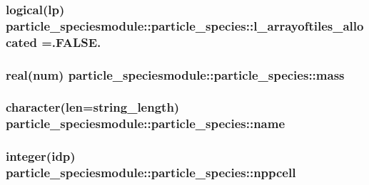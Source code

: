 \subsubsection[{\texorpdfstring{l\+\_\+arrayoftiles\+\_\+allocated}{l_arrayoftiles_allocated}}]{\setlength{\rightskip}{0pt plus 5cm}logical(lp) particle\+\_\+speciesmodule\+::particle\+\_\+species\+::l\+\_\+arrayoftiles\+\_\+allocated =.F\+A\+L\+S\+E.}\hypertarget{structparticle__speciesmodule_1_1particle__species_a7925d60d14a0ec4da1bb9fffb5e5f2ef}{}\label{structparticle__speciesmodule_1_1particle__species_a7925d60d14a0ec4da1bb9fffb5e5f2ef}
\subsubsection[{\texorpdfstring{mass}{mass}}]{\setlength{\rightskip}{0pt plus 5cm}real(num) particle\+\_\+speciesmodule\+::particle\+\_\+species\+::mass}\hypertarget{structparticle__speciesmodule_1_1particle__species_a06cae9ba8f87d3cfcfd1df4b7b2a31d6}{}\label{structparticle__speciesmodule_1_1particle__species_a06cae9ba8f87d3cfcfd1df4b7b2a31d6}
\subsubsection[{\texorpdfstring{name}{name}}]{\setlength{\rightskip}{0pt plus 5cm}character(len=string\+\_\+length) particle\+\_\+speciesmodule\+::particle\+\_\+species\+::name}\hypertarget{structparticle__speciesmodule_1_1particle__species_aa1e042e7e07eb5fbf85a87e3fde7e325}{}\label{structparticle__speciesmodule_1_1particle__species_aa1e042e7e07eb5fbf85a87e3fde7e325}
\subsubsection[{\texorpdfstring{nppcell}{nppcell}}]{\setlength{\rightskip}{0pt plus 5cm}integer(idp) particle\+\_\+speciesmodule\+::particle\+\_\+species\+::nppcell}\hypertarget{structparticle__speciesmodule_1_1particle__species_a85d9fbe02cbe094dd5d45b29e5a5cb52}{}\label{structparticle__speciesmodule_1_1particle__species_a85d9fbe02cbe094dd5d45b29e5a5cb52}

